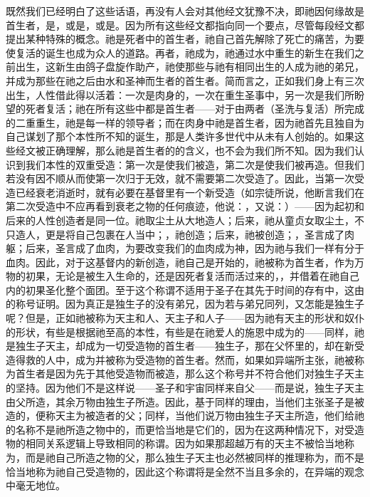 既然我们已经明白了这些话语，再没有人会对其他经文犹豫不决，即祂因何缘故是首生者，是，或是，或是。因为所有这些经文都指向同一个要点，尽管每段经文都提出某种特殊的概念。祂是死者中的首生者，祂自己首先解除了死亡的痛苦，为要使复活的诞生也成为众人的道路。再者，祂成为，祂通过水中重生的新生在我们之前出生，这新生由鸽子盘旋作助产，祂使那些与祂有相同出生的人成为祂的弟兄，并成为那些在祂之后由水和圣神而生者的首生者。简而言之，正如我们身上有三次出生，人性借此得以活着：一次是肉身的，一次在重生圣事中，另一次是我们所盼望的死者复活；祂在所有这些中都是首生者——对于由两者（圣洗与复活）所完成的二重重生，祂是每一样的领导者；而在肉身中祂是首生者，因为祂首先且独自为自己谋划了那个本性所不知的诞生，那是人类许多世代中从未有人创始的。如果这些经文被正确理解，那么祂是首生者的的含义，也不会为我们所不知。因为我们认识到我们本性的双重受造：第一次是使我们被造，第二次是使我们被再造。但我们若没有因不顺从而使第一次归于无效，就不需要第二次受造了。因此，当第一次受造已经衰老消逝时，就有必要在基督里有一个新受造（如宗徒所说，他断言我们在第二次受造中不应再看到衰老之物的任何痕迹，他说：，又说：）——因为起初和后来的人性创造者是同一位。祂取尘土从大地造人；后来，祂从童贞女取尘土，不只造人，更是将自己包裹在人当中；，祂创造；后来，祂被创造；，圣言成了肉躯；后来，圣言成了血肉，为要改变我们的血肉成为神，因为祂与我们一样有分于血肉。因此，对于这基督内的新创造，祂自己是开始的，祂被称为首生者，作为万物的初果，无论是被生入生命的，还是因死者复活而活过来的，，并借着在祂自己内的初果圣化整个面团。至于这个称谓不适用于圣子在其先于时间的存有中，这由的称号证明。因为真正是独生子的没有弟兄，因为若与弟兄同列，又怎能是独生子呢？但是，正如祂被称为天主和人、天主子和人子——因为祂有天主的形状和奴仆的形状，有些是根据祂至高的本性，有些是在祂爱人的施恩中成为的——同样，祂是独生子天主，却成为一切受造物的首生者——独生子，那在父怀里的，却在新受造得救的人中，成为并被称为受造物的首生者。然而，如果如异端所主张，祂被称为首生者是因为先于其他受造物而被造，那么这个称号并不符合他们对独生子天主的坚持。因为他们不是这样说——圣子和宇宙同样来自父——而是说，独生子天主由父所造，其余万物由独生子所造。因此，基于同样的理由，当他们主张圣子是被造的，便称天主为被造者的父；同样，当他们说万物由独生子天主所造，他们给祂的名称不是祂所造之物中的，而更恰当地是它们的，因为在这两种情况下，对受造物的相同关系逻辑上导致相同的称谓。因为如果那超越万有的天主不被恰当地称为，而是祂自己所造之物的父，那么独生子天主也必然被同样的推理称为，而不是恰当地称为祂自己受造物的，因此这个称谓将是全然不当且多余的，在异端的观念中毫无地位。\par

